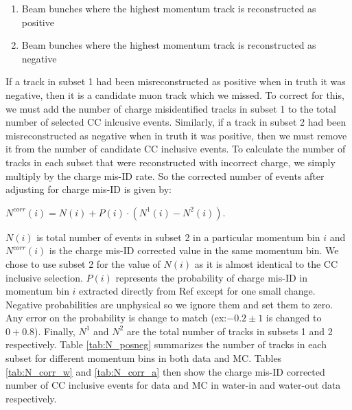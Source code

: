 \begin{enumerate}
\item Beam bunches where the highest momentum track is reconstructed as positive
\item Beam bunches where the highest momentum track is reconstructed as negative
\end{enumerate}

If a track in subset 1 had been misreconstructed as positive when in truth it was negative, then it is a candidate muon track which we missed. To correct for this, we must add the number of charge misidentified tracks in subset 1 to the total number of selected CC inlcusive events. Similarly, if a track in subset 2 had been misreconstructed as negative when in truth it was positive, then we must remove it from the number of candidate CC inclusive events. To calculate the number of tracks in each subset that were reconstructed with incorrect charge, we simply multiply by the charge mis-ID rate. So the corrected number of events after adjusting for charge mis-ID is given by:

\begin{center}
$N^{corr}(i) = N(i)+P(i)\cdot\left(N^{1}(i)-N^{2}(i)\right)$.
\end{center}

$N(i)$ is total number of events in subset 2 in a particular momentum bin $i$ and $N^{corr}(i)$ is the charge mis-ID corrected value in the same momentum bin. We chose to use subset 2 for the value of $N(i)$ as it is almost identical to the CC inclusive selection. $P(i)$ represents the probability of charge mis-ID in momentum bin $i$ extracted directly from Ref \cite{chmisidtn} except for one small change. Negative probabilities are unphysical so we ignore them and set them to zero. Any error on the probability is change to match (ex:$-0.2\pm 1$ is changed to $0 + 0.8$). Finally, $N^1$ and $N^2$ are the total number of tracks in subsets 1 and 2 respectively. Table \ref{tab:N_posneg} summarizes the number of tracks in each subset for different momentum bins in both data and MC. Tables \ref{tab:N_corr_w} and \ref{tab:N_corr_a} then show the charge mis-ID corrected number of CC inclusive events for data and MC in water-in and water-out data respectively. 

